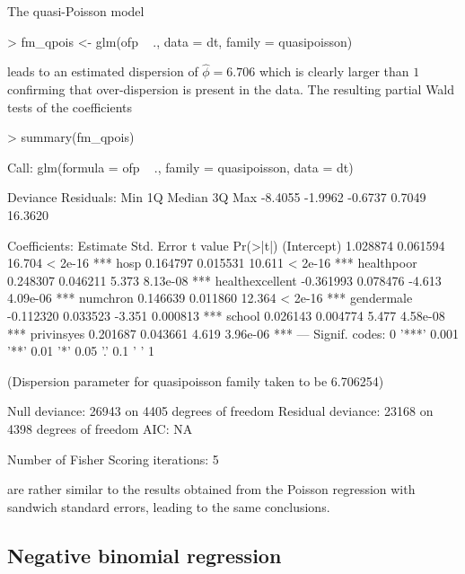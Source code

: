 \documentclass{Z}
\begin{document}
The quasi-Poisson model
\begin{Schunk}
\begin{Sinput}
> fm_qpois <- glm(ofp ~ ., data = dt, family = quasipoisson)
\end{Sinput}
\end{Schunk}
leads to an estimated dispersion of
$\hat \phi = 6.706$ which
is clearly larger than $1$ confirming that over-dispersion is present in
the data. The resulting partial Wald tests of the coefficients
\begin{Schunk}
\begin{Sinput}
> summary(fm_qpois)
\end{Sinput}
\begin{Soutput}
Call:
glm(formula = ofp ~ ., family = quasipoisson, data = dt)

Deviance Residuals: 
    Min       1Q   Median       3Q      Max  
-8.4055  -1.9962  -0.6737   0.7049  16.3620  

Coefficients:
                 Estimate Std. Error t value Pr(>|t|)    
(Intercept)      1.028874   0.061594  16.704  < 2e-16 ***
hosp             0.164797   0.015531  10.611  < 2e-16 ***
healthpoor       0.248307   0.046211   5.373 8.13e-08 ***
healthexcellent -0.361993   0.078476  -4.613 4.09e-06 ***
numchron         0.146639   0.011860  12.364  < 2e-16 ***
gendermale      -0.112320   0.033523  -3.351 0.000813 ***
school           0.026143   0.004774   5.477 4.58e-08 ***
privinsyes       0.201687   0.043661   4.619 3.96e-06 ***
---
Signif. codes:  0 '***' 0.001 '**' 0.01 '*' 0.05 '.' 0.1 ' ' 1 

(Dispersion parameter for quasipoisson family taken to be 6.706254)

    Null deviance: 26943  on 4405  degrees of freedom
Residual deviance: 23168  on 4398  degrees of freedom
AIC: NA

Number of Fisher Scoring iterations: 5
\end{Soutput}
\end{Schunk}
are rather similar to the results obtained from the Poisson regression with
sandwich standard errors, leading to the same conclusions.


\subsection{Negative binomial regression}
\end{document}
